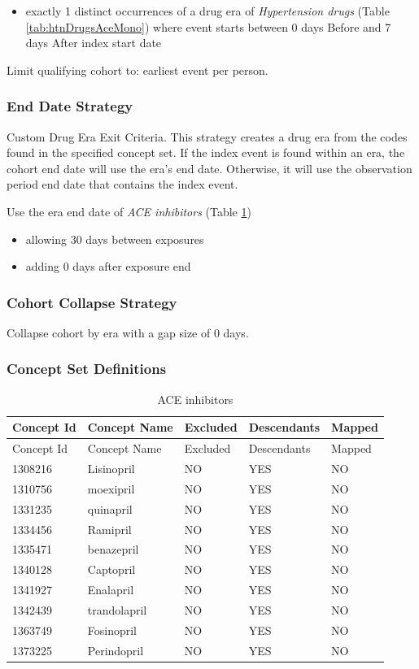 \documentclass[11pt]{book}
\providecommand{\tightlist}{%
  \setlength{\itemsep}{0pt}\setlength{\parskip}{0pt}}
\theoremstyle{definition}
\theoremstyle{definition}
\theoremstyle{definition}
\theoremstyle{remark}
\begin{document}
\begin{itemize}
\tightlist
\item
  exactly 1 distinct occurrences of a drug era of \emph{Hypertension
  drugs} (Table \ref{tab:htnDrugsAceMono}) where event starts between 0
  days Before and 7 days After index start date
\end{itemize}

Limit qualifying cohort to: earliest event per person.

\subsubsection*{End Date Strategy}\label{end-date-strategy-1}

Custom Drug Era Exit Criteria. This strategy creates a drug era from the
codes found in the specified concept set. If the index event is found
within an era, the cohort end date will use the era's end date.
Otherwise, it will use the observation period end date that contains the
index event.

Use the era end date of \emph{ACE inhibitors} (Table
\ref{tab:aceInhibitorsMono})

\begin{itemize}
\tightlist
\item
  allowing 30 days between exposures
\item
  adding 0 days after exposure end
\end{itemize}

\subsubsection*{Cohort Collapse
Strategy}\label{cohort-collapse-strategy-1}

Collapse cohort by era with a gap size of 0 days.

\subsubsection*{Concept Set
Definitions}\label{concept-set-definitions-1}

\begin{longtable}[]{@{}lllll@{}}
\caption{\label{tab:aceInhibitorsMono} ACE inhibitors}\tabularnewline
\toprule
Concept Id & Concept Name & Excluded & Descendants &
Mapped\tabularnewline
\midrule
\endfirsthead
\toprule
Concept Id & Concept Name & Excluded & Descendants &
Mapped\tabularnewline
\midrule
\endhead
1308216 & Lisinopril & NO & YES & NO\tabularnewline
1310756 & moexipril & NO & YES & NO\tabularnewline
1331235 & quinapril & NO & YES & NO\tabularnewline
1334456 & Ramipril & NO & YES & NO\tabularnewline
1335471 & benazepril & NO & YES & NO\tabularnewline
1340128 & Captopril & NO & YES & NO\tabularnewline
1341927 & Enalapril & NO & YES & NO\tabularnewline
1342439 & trandolapril & NO & YES & NO\tabularnewline
1363749 & Fosinopril & NO & YES & NO\tabularnewline
1373225 & Perindopril & NO & YES & NO\tabularnewline
\bottomrule
\end{longtable}
\end{document}
